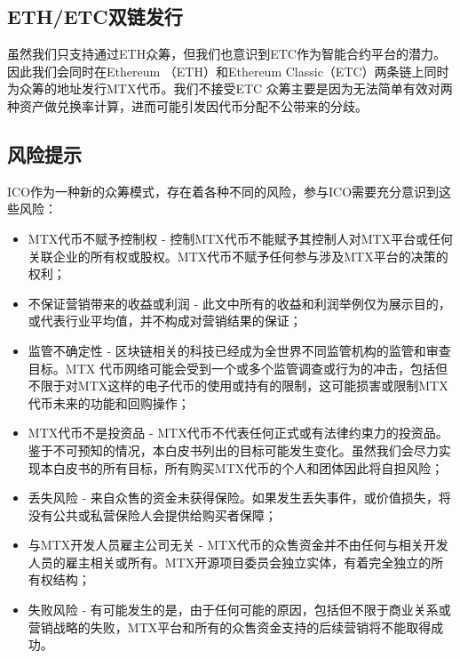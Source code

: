 \documentclass[UTF8,nofonts]{ctexart}
\begin{document}
\begin{appendices}
\subsection{ETH/ETC双链发行\label{sec:chains}}

虽然我们只支持通过ETH众筹，但我们也意识到ETC作为智能合约平台的潜力。因此我们会同时在Ethereum （ETH）和Ethereum Classic（ETC）两条链上同时为众筹的地址发行MTX代币。我们不接受ETC 众筹主要是因为无法简单有效对两种资产做兑换率计算，进而可能引发因代币分配不公带来的分歧。


\subsection{风险提示\label{sec:risks}}

ICO作为一种新的众筹模式，存在着各种不同的风险，参与ICO需要充分意识到这些风险：
\begin{itemize}
	\item MTX代币不赋予控制权 - 控制MTX代币不能赋予其控制人对MTX平台或任何关联企业的所有权或股权。MTX代币不赋予任何参与涉及MTX平台的决策的权利；
	\item 不保证营销带来的收益或利润 - 此文中所有的收益和利润举例仅为展示目的，或代表行业平均值，并不构成对营销结果的保证；
	\item 监管不确定性 - 区块链相关的科技已经成为全世界不同监管机构的监管和审查目标。MTX 代币网络可能会受到一个或多个监管调查或行为的冲击，包括但不限于对MTX这样的电子代币的使用或持有的限制，这可能损害或限制MTX代币未来的功能和回购操作；
	\item MTX代币不是投资品 - MTX代币不代表任何正式或有法律约束力的投资品。鉴于不可预知的情况，本白皮书列出的目标可能发生变化。虽然我们会尽力实现本白皮书的所有目标，所有购买MTX代币的个人和团体因此将自担风险；
	\item 丢失风险 - 来自众售的资金未获得保险。如果发生丢失事件，或价值损失，将没有公共或私营保险人会提供给购买者保障；
	\item 与MTX开发人员雇主公司无关 - MTX代币的众售资金并不由任何与相关开发人员的雇主相关或所有。MTX开源项目委员会独立实体，有着完全独立的所有权结构；
	\item 失败风险 - 有可能发生的是，由于任何可能的原因，包括但不限于商业关系或营销战略的失败，MTX平台和所有的众售资金支持的后续营销将不能取得成功。
\end{itemize}


\end{appendices}
\end{document}
